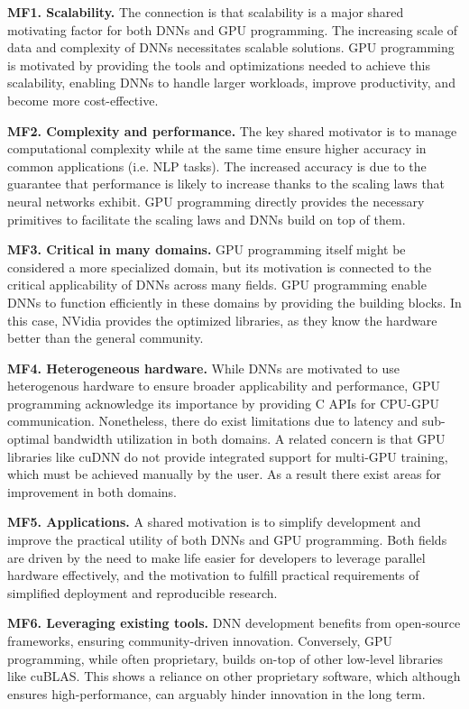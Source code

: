 \textbf{MF1. Scalability.}
The connection is that scalability is a major shared motivating factor for both DNNs and GPU programming.
The increasing scale of data and complexity of DNNs necessitates scalable solutions. GPU programming is
motivated by providing the tools and optimizations needed to achieve this scalability, enabling DNNs to
handle larger workloads, improve productivity, and become more cost-effective.

\textbf{MF2. Complexity and performance.}
The key shared motivator is to manage computational complexity while at the same time ensure higher accuracy
in common applications (i.e. NLP tasks). The increased accuracy is due to the guarantee that performance
is likely to increase thanks to the scaling laws that neural networks exhibit.
GPU programming directly provides the necessary primitives to facilitate the scaling laws and DNNs build on top of them.

\textbf{MF3. Critical in many domains.}
GPU programming itself might be considered a more specialized domain, but its motivation is connected to the
critical applicability of DNNs across many fields. GPU programming enable DNNs to function efficiently in
these domains by providing the building blocks. In this case, NVidia provides the optimized libraries, as
they know the hardware better than the general community.

\textbf{MF4. Heterogeneous hardware.}
While DNNs are motivated to use heterogenous hardware to ensure broader applicability and performance, GPU programming
acknowledge its importance by providing C APIs for CPU-GPU communication. Nonetheless, there do exist limitations
due to latency and sub-optimal bandwidth utilization in both domains. A related concern is that GPU libraries like cuDNN do not provide
integrated support for multi-GPU training, which must be achieved manually by the user. As a result there exist areas
for improvement in both domains.

\textbf{MF5. Applications.}
A shared motivation is to simplify development and improve the practical utility of both DNNs and GPU programming.
Both fields are driven by the need to make life easier for developers to leverage parallel hardware effectively,
and the motivation to fulfill practical requirements of simplified deployment and reproducible research.

\textbf{MF6. Leveraging existing tools.}
DNN development benefits from open-source frameworks, ensuring community-driven innovation. Conversely, GPU programming,
while often proprietary, builds on-top of other low-level libraries like cuBLAS. This shows a reliance on other
proprietary software, which although ensures high-performance, can arguably hinder innovation in the long term.

